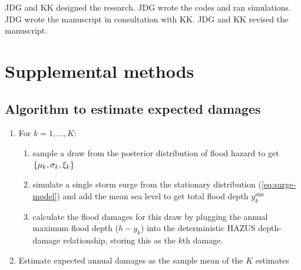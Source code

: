\documentclass[11pt]{article}
\begin{document}
JDG and KK designed the research.
JDG wrote the codes and ran simulations.
JDG wrote the manuscript in consultation with KK.
JDG and KK revised the manuscript.

\printbibliography

\appendix
\newcommand{\hbAppendixPrefix}{S}
\renewcommand{\thefigure}{\hbAppendixPrefix\arabic{figure}}
\setcounter{figure}{0}
\renewcommand{\thetable}{\hbAppendixPrefix\arabic{table}}
\setcounter{table}{0}
\renewcommand{\theequation}{\hbAppendixPrefix\arabic{equation}}
\setcounter{equation}{0}

\newpage
\section{Supplemental methods}

\subsection{Algorithm to estimate expected damages}\label{sec:alg-ead}

\begin{enumerate}
    \item For $k=1, \ldots, K$:
          \begin{enumerate}
              \item sample a draw from the posterior distribution of flood hazard to get $\qty{ \mu_k, \sigma_k, \xi_k }$
              \item simulate a single storm surge from the stationary distribution (\cref{eq:surge-model}) and add the mean sea level to get total flood depth $y^\mathrm{sim}_k$
              \item calculate the flood damages for this draw by plugging the annual maximum flood depth ($h - y_k$) into  the deterministic HAZUS depth-damage relationship, storing this as the $k$th damage.
          \end{enumerate}
    \item Estimate expected annual damages as the sample mean of the $K$ estimates
\end{enumerate}
\end{document}
